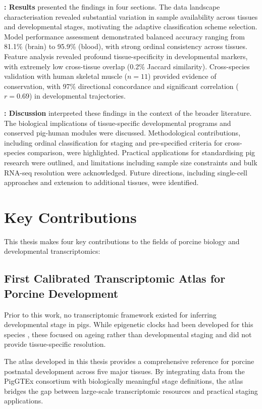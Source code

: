 \textbf{: Results} presented the findings in four sections. The data landscape characterisation revealed substantial variation in sample availability across tissues and developmental stages, motivating the adaptive classification scheme selection. Model performance assessment demonstrated balanced accuracy ranging from 81.1\% (brain) to 95.9\% (blood), with strong ordinal consistency across tissues. Feature analysis revealed profound tissue-specificity in developmental markers, with extremely low cross-tissue overlap (0.2\% Jaccard similarity). Cross-species validation with human skeletal muscle ($n = 11$) provided evidence of conservation, with 97\% directional concordance and significant correlation ($r = 0.69$) in developmental trajectories.

\textbf{: Discussion} interpreted these findings in the context of the broader literature. The biological implications of tissue-specific developmental programs and conserved pig-human modules were discussed. Methodological contributions, including ordinal classification for staging and pre-specified criteria for cross-species comparison, were highlighted. Practical applications for standardising pig research were outlined, and limitations including sample size constraints and bulk RNA-seq resolution were acknowledged. Future directions, including single-cell approaches and extension to additional tissues, were identified.


\section{Key Contributions}\label{sec:conclusions:contributions}

This thesis makes four key contributions to the fields of porcine biology and developmental transcriptomics:

\subsection{First Calibrated Transcriptomic Atlas for Porcine Development}

Prior to this work, no transcriptomic framework existed for inferring developmental stage in pigs. While epigenetic clocks had been developed for this species \parencite{schachtschneider_epigenetic_2021}, these focused on ageing rather than developmental staging and did not provide tissue-specific resolution.

The atlas developed in this thesis provides a comprehensive reference for porcine postnatal development across five major tissues. By integrating data from the PigGTEx consortium \parencite{teng_compendium_2024, chen_construction_2025} with biologically meaningful stage definitions, the atlas bridges the gap between large-scale transcriptomic resources and practical staging applications.

